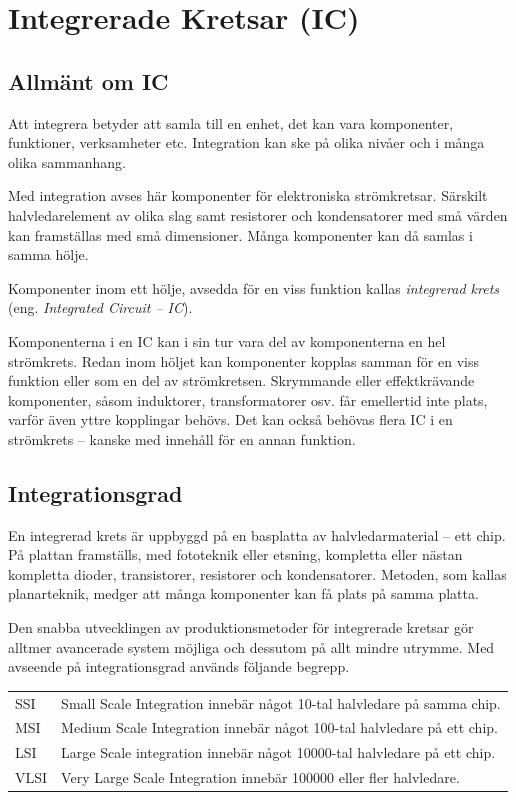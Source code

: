 \section{Integrerade Kretsar (IC)}

\subsection{Allmänt om IC}

Att integrera betyder att samla till en enhet, det kan vara komponenter,
funktioner, verksamheter etc. Integration kan ske på olika nivåer och i många
olika sammanhang.

Med integration avses här komponenter för elektroniska strömkretsar. Särskilt
halvledarelement av olika slag samt resistorer och kondensatorer med små värden
kan framställas med små dimensioner. Många komponenter kan då samlas i samma
hölje.

Komponenter inom ett hölje, avsedda för en viss funktion kallas
\emph{integrerad krets} (eng. \emph{Integrated Circuit -- IC}).

Komponenterna i en IC kan i sin tur vara del av komponenterna en hel strömkrets.
Redan inom höljet kan komponenter kopplas samman för en viss funktion eller som
en del av strömkretsen. Skrymmande eller effektkrävande komponenter, såsom
induktorer, transformatorer osv. får emellertid inte plats, varför även yttre
kopplingar behövs. Det kan också behövas flera IC i en strömkrets -- kanske med
innehåll för en annan funktion.

\subsection{Integrationsgrad}

En integrerad krets är uppbyggd på en basplatta av halvledarmaterial --
ett chip.
På plattan framställs, med fototeknik eller etsning, kompletta eller nästan
kompletta dioder, transistorer, resistorer och kondensatorer. Metoden, som
kallas planarteknik, medger att många komponenter kan få plats på samma platta.

Den snabba utvecklingen av produktionsmetoder för integrerade kretsar gör
alltmer avancerade system möjliga och dessutom på allt mindre utrymme. Med
avseende på integrationsgrad används följande begrepp.

\begin{tabular}{lp{6cm}}
SSI & Small Scale Integration innebär något 10-tal halvledare på samma chip. \\
MSI & Medium Scale Integration innebär något 100-tal halvledare på ett chip. \\
LSI & Large Scale integration innebär något 10000-tal halvledare på ett chip. \\
VLSI & Very Large Scale Integration innebär 100000 eller fler halvledare. \\
\end{tabular}

